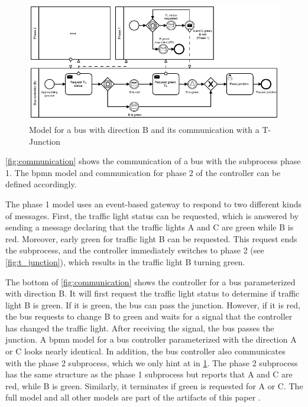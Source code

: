 \documentclass{jot}
\begin{document}
\begin{figure}[ht]
    \centering
    \includegraphics[width=1\textwidth]{figures/communication.pdf}
    \caption{Model for a bus with direction B and its communication with a T-Junction}
    \label{fig:communication}
\end{figure}

\autoref{fig:communication} shows the communication of a bus with the subprocess phase 1.
The \gls*{bpmn} model and communication for phase 2 of the controller can be defined accordingly.

The phase 1 model uses an event-based gateway to respond to two different kinds of messages.
First, the traffic light status can be requested, which is answered by sending a message declaring that the traffic lights A and C are green while B is red.
Moreover, early green for traffic light B can be requested.
This request ends the subprocess, and the controller immediately switches to phase 2 (see \cref{fig:t_junction}), which results in the traffic light B turning green.

The bottom of \autoref{fig:communication} shows the controller for a bus parameterized with direction B.
It will first request the traffic light status to determine if traffic light B is green.
If it is green, the bus can pass the junction.
However, if it is red, the bus requests to change B to green and waits for a signal that the controller has changed the traffic light.
After receiving the signal, the bus passes the junction.
A \gls*{bpmn} model for a bus controller parameterized with the direction A or C looks nearly identical.
In addition, the bus controller also communicates with the phase 2 subprocess, which we only hint at in \cref{fig:communication}.
The phase 2 subprocess has the same structure as the phase 1 subprocess but reports that A and C are red, while B is green.
Similarly, it terminates if green is requested for A or C.
The full model and all other models are part of the artifacts of this paper \cite{krauterArtifactsBehavioralConsistency2022}.
\end{document}
